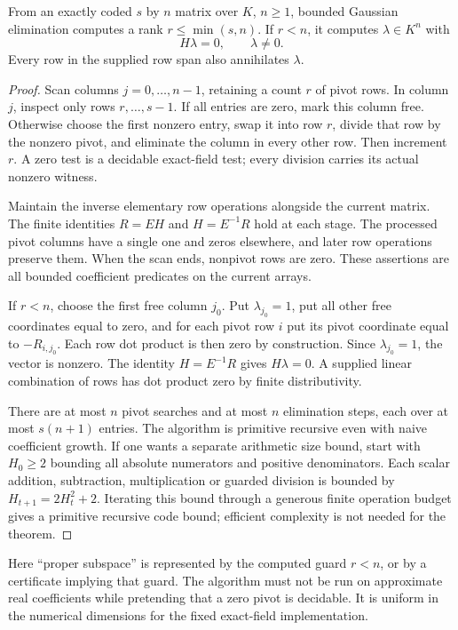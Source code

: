 \begin{lemma}\label{lem:annihilator}
From an exactly coded $s$ by $n$ matrix over $K$, $n\ge1$, bounded Gaussian elimination computes a rank $r\le\min(s,n)$. If $r<n$, it computes $\lambda\in K^n$ with
\[
 H\lambda=0,\qquad \lambda\ne0.
\]
Every row in the supplied row span also annihilates $\lambda$.
\end{lemma}
\begin{proof}
Scan columns $j=0,\ldots,n-1$, retaining a count $r$ of pivot rows. In column $j$, inspect only rows $r,\ldots,s-1$. If all entries are zero, mark this column free. Otherwise choose the first nonzero entry, swap it into row $r$, divide that row by the nonzero pivot, and eliminate the column in every other row. Then increment $r$. A zero test is a decidable exact-field test; every division carries its actual nonzero witness.

Maintain the inverse elementary row operations alongside the current matrix. The finite identities $R=EH$ and $H=E^{-1}R$ hold at each stage. The processed pivot columns have a single one and zeros elsewhere, and later row operations preserve them. When the scan ends, nonpivot rows are zero. These assertions are all bounded coefficient predicates on the current arrays.

If $r<n$, choose the first free column $j_0$. Put $\lambda_{j_0}=1$, put all other free coordinates equal to zero, and for each pivot row $i$ put its pivot coordinate equal to $-R_{i,j_0}$. Each row dot product is then zero by construction. Since $\lambda_{j_0}=1$, the vector is nonzero. The identity $H=E^{-1}R$ gives $H\lambda=0$. A supplied linear combination of rows has dot product zero by finite distributivity.

There are at most $n$ pivot searches and at most $n$ elimination steps, each over at most $s(n+1)$ entries. The algorithm is primitive recursive even with naive coefficient growth. If one wants a separate arithmetic size bound, start with $H_0\ge2$ bounding all absolute numerators and positive denominators. Each scalar addition, subtraction, multiplication or guarded division is bounded by $H_{t+1}=2H_t^2+2$. Iterating this bound through a generous finite operation budget gives a primitive recursive code bound; efficient complexity is not needed for the theorem.
\end{proof}

Here ``proper subspace'' is represented by the computed guard $r<n$, or by a certificate implying that guard. The algorithm must not be run on approximate real coefficients while pretending that a zero pivot is decidable. It is uniform in the numerical dimensions for the fixed exact-field implementation.

